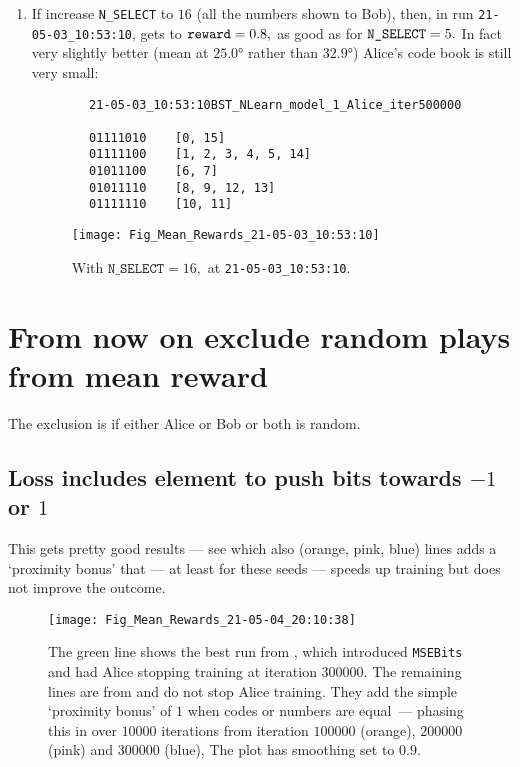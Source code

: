 \documentclass[12pt]{article}
\begin{document}
\begin{enumerate}
	\item If increase \verb|N_SELECT| to $16$ (all the numbers shown to Bob), then, in run \verb|21-05-03_10:53:10|, gets to $\verb|reward|=0.8,$ as good as for $\verb|N_SELECT|=5.$ In fact very slightly better (mean at  $\ang{25.0}$ rather than $\ang{32.9}$) Alice's code book is still very small:
	\begin{lstlisting}
		21-05-03_10:53:10BST_NLearn_model_1_Alice_iter500000
		
		01111010	[0, 15]
		01111100	[1, 2, 3, 4, 5, 14]
		01011100	[6, 7]
		01011110	[8, 9, 12, 13]
		01111110	[10, 11]
	\end{lstlisting}
\begin{figure}
	\centering
	\texttt{[image: Fig\_Mean\_Rewards\_21-05-03\_10:53:10]}
	\caption{With $\texttt{N\_SELECT}=16,$ at \texttt{21-05-03\_10:53:10}.}
	\label{fig:figmeanrewards21-05-03105310}
\end{figure}
	
\end{enumerate}

\section{From now on exclude random plays from mean reward}

The exclusion is if either Alice or Bob or both is random.

\subsection{Loss includes element to push bits towards $-1$ or $1$}

This gets pretty good results --- see  which also (orange, pink, blue) lines adds a `proximity bonus' that --- at least for these seeds --- speeds up training but does not improve the outcome.
\begin{figure}
	\centering
	\texttt{[image: Fig\_Mean\_Rewards\_21-05-04\_20:10:38]}
	\caption{The green line shows the best run from , which introduced \texttt{MSEBits} and had Alice stopping training at iteration $\num{300000}.$  The remaining lines are from  and do not stop Alice training.  They add the simple `proximity bonus' of $1$ when codes or numbers are equal~--- phasing this in over $\num{10000}$ iterations from iteration $\num{100000}$ (orange), $\num{200000}$ (pink) and $\num{300000}$ (blue),  The plot has smoothing set to $0.9.$}
	\label{fig:figmeanrewards21-05-04201038}
\end{figure}
\end{document}
